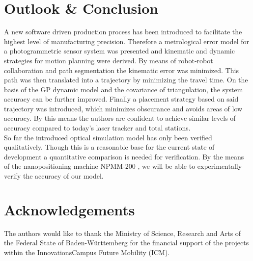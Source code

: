 \documentclass[5p,times,procedia]{elsarticle}
\begin{document}
\section{Outlook \& Conclusion}
%
A new software driven production process has been introduced to facilitate the highest level of manufacturing precision.
Therefore a metrological error model for a photogrammetric sensor system was presented and kinematic and dynamic strategies
for motion planning were derived. By means of robot-robot collaboration and path segmentation the kinematic error was minimized. This path was then translated into a trajectory by minimizing the travel time. On the basis of the GP dynamic model and the covariance of triangulation, the system accuracy can be further improved. Finally a placement strategy based on said trajectory was introduced, which minimizes obscurance and avoids areas of low accuracy. By this means the authors are confident to achieve similar levels of accuracy compared to today's laser tracker and total stations.\\
So far the introduced optical simulation model has only been verified qualitatively. Though this is a reasonable base for the current state of development a quantitative comparison is needed for verification. By the means of the nanopositioning machine NPMM-200 \cite{Jaeger2016}, we will be able to experimentally verify the accuracy of our model.
%
\section*{Acknowledgements}
The authors would like to thank the Ministry of Science, Research and Arts of the Federal State of Baden-Württemberg for the financial support of the projects within the InnovationsCampus Future Mobility (ICM).
%


%
\clearpage\onecolumn
%
\normalMode
%
\end{document}
